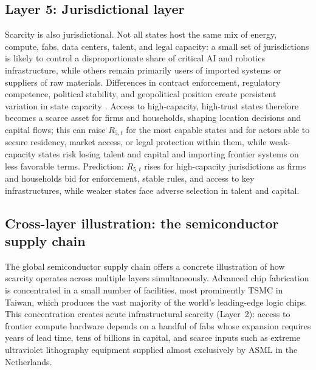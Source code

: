 \documentclass[11pt]{article}
\begin{document}
\subsection{\texorpdfstring{Layer 5: Jurisdictional layer}{Layer 5: Jurisdictional layer}}
\label{subsec:jurisdictional_layer}

Scarcity is also jurisdictional. Not all states host the same mix of energy, compute, fabs, data centers, talent, and legal capacity: a small set of jurisdictions is likely to control a disproportionate share of critical AI and robotics infrastructure, while others remain primarily users of imported systems or suppliers of raw materials. Differences in contract enforcement, regulatory competence, political stability, and geopolitical position create persistent variation in state capacity \citep[e.g.][]{BesleyPersson2009StateCapacity}. Access to high-capacity, high-trust states therefore becomes a scarce asset for firms and households, shaping location decisions and capital flows; this can raise \(R_{5,t}\) for the most capable states and for actors able to secure residency, market access, or legal protection within them, while weak-capacity states risk losing talent and capital and importing frontier systems on less favorable terms. Prediction: \(R_{5,t}\) rises for high-capacity jurisdictions as firms and households bid for enforcement, stable rules, and access to key infrastructures, while weaker states face adverse selection in talent and capital.

\subsection{Cross-layer illustration: the semiconductor supply chain}
\label{subsec:semiconductor_illustration}

The global semiconductor supply chain offers a concrete illustration of how scarcity operates across multiple layers simultaneously. Advanced chip fabrication is concentrated in a small number of facilities, most prominently TSMC in Taiwan, which produces the vast majority of the world's leading-edge logic chips. This concentration creates acute infrastructural scarcity (Layer~2): access to frontier compute hardware depends on a handful of fabs whose expansion requires years of lead time, tens of billions in capital, and scarce inputs such as extreme ultraviolet lithography equipment supplied almost exclusively by ASML in the Netherlands.
\end{document}
